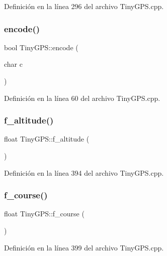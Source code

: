 Definición en la línea 296 del archivo Tiny\+G\+P\+S.\+cpp.

\mbox{\label{class_tiny_g_p_s_ab6b2697b2968dc6a020404795f1aa169}} 
\subsubsection{\texorpdfstring{encode()}{encode()}}
{\footnotesize\ttfamily bool Tiny\+G\+P\+S\+::encode (\begin{DoxyParamCaption}\item[{char}]{c }\end{DoxyParamCaption})}



Definición en la línea 60 del archivo Tiny\+G\+P\+S.\+cpp.

\mbox{\label{class_tiny_g_p_s_a5838cec249cb38628734f84defa24b94}} 
\subsubsection{\texorpdfstring{f\+\_\+altitude()}{f\_altitude()}}
{\footnotesize\ttfamily float Tiny\+G\+P\+S\+::f\+\_\+altitude (\begin{DoxyParamCaption}{ }\end{DoxyParamCaption})}



Definición en la línea 394 del archivo Tiny\+G\+P\+S.\+cpp.

\mbox{\label{class_tiny_g_p_s_a4e93f23a509fc50df411d220fe510be0}} 
\subsubsection{\texorpdfstring{f\+\_\+course()}{f\_course()}}
{\footnotesize\ttfamily float Tiny\+G\+P\+S\+::f\+\_\+course (\begin{DoxyParamCaption}{ }\end{DoxyParamCaption})}



Definición en la línea 399 del archivo Tiny\+G\+P\+S.\+cpp.

